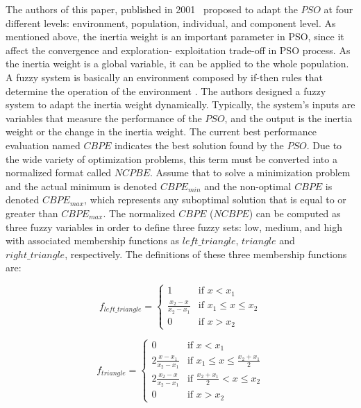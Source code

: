 The authors of this paper, published in 2001~\cite{shi2001fuzzy} proposed to adapt the $PSO$ at four different levels: environment, population, individual, and component level. As mentioned above, the inertia weight is an important parameter in PSO, since it affect the convergence and exploration- exploitation trade-off in PSO process. As the inertia weight is a global variable, it can be applied to the whole population. A fuzzy system is basically an environment composed by if-then rules that determine the operation of the environment \cite{shi2001fuzzy}. The authors designed a fuzzy system to adapt the inertia weight dynamically. Typically, the system's inputs are variables that measure the performance of the $PSO$, and the output is the inertia weight or the change in the inertia weight. The current best performance evaluation named $CBPE$ indicates the best solution found by the $PSO$. Due to the wide variety of optimization problems, this term must be converted into a normalized format called $NCPBE$. Assume that to solve a minimization problem and the actual minimum is denoted $CBPE_{min}$ and the non-optimal $CBPE$ is denoted $CBPE_{max}$, which represents any suboptimal solution that is equal to or greater than $CBPE_{max}$. The normalized $CBPE$ ($NCBPE$) can be computed as three fuzzy variables in order to define three fuzzy sets: low, medium, and high with associated membership functions as $left\_triangle$, $triangle$ and $right\_triangle$, respectively. The definitions of these three membership functions are: 

\begin{equation}
    f_{left\_triangle}=
    \begin{cases}
    1 & \text{if $x < x_1$}\\
    \frac{x_2 -x}{x_2 -x_1} & \text{if $x_1 \leq x \leq x_2$}\\
    0 & \text{if $x > x_2$}
    \end{cases}
\end{equation}

\begin{equation}
    f_{triangle}= \begin{cases}
    0 & \text{if $x<x_1$}\\
    2 \frac{x - x_1}{x_2 -x_1} & \text{if $x_1 \leq x \leq \frac{x_2 +x_1}{2}$}\\
    2 \frac{x_2 -x}{x_2 -x_1} & \text{if $\frac{x_2 +x_1}{2} < x \leq x_2$}\\
    0 & \text{if $x > x_2$}
    \end{cases}
\end{equation}

